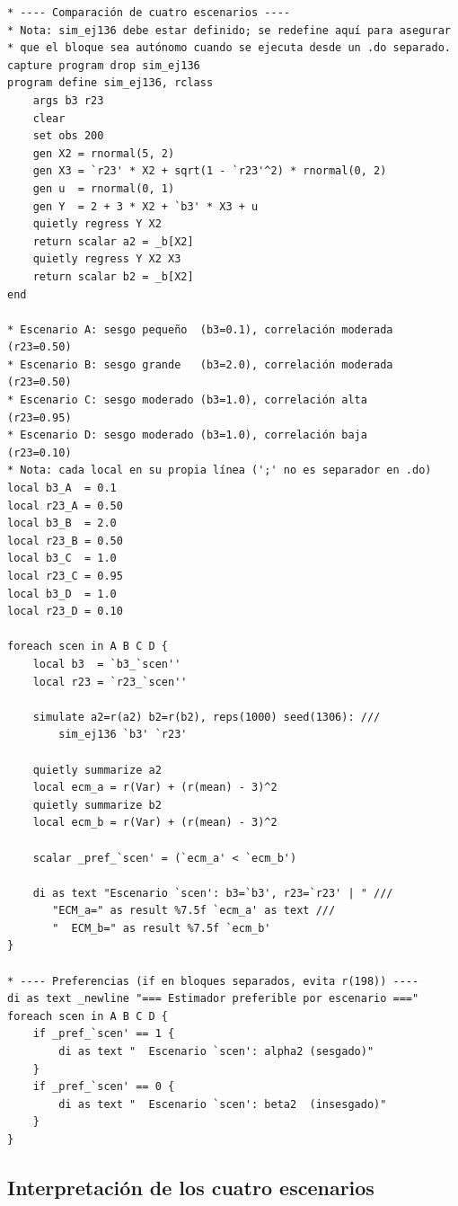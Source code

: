 \documentclass[12pt, letterpaper]{article}
\begin{document}
\begin{lstlisting}[caption={Cuatro escenarios de tradeoff sesgo-varianza
  (requiere ejecutar el bloque anterior primero para definir sim\_ej136)}]
* ---- Comparación de cuatro escenarios ----
* Nota: sim_ej136 debe estar definido; se redefine aquí para asegurar
* que el bloque sea autónomo cuando se ejecuta desde un .do separado.
capture program drop sim_ej136
program define sim_ej136, rclass
    args b3 r23
    clear
    set obs 200
    gen X2 = rnormal(5, 2)
    gen X3 = `r23' * X2 + sqrt(1 - `r23'^2) * rnormal(0, 2)
    gen u  = rnormal(0, 1)
    gen Y  = 2 + 3 * X2 + `b3' * X3 + u
    quietly regress Y X2
    return scalar a2 = _b[X2]
    quietly regress Y X2 X3
    return scalar b2 = _b[X2]
end

* Escenario A: sesgo pequeño  (b3=0.1), correlación moderada (r23=0.50)
* Escenario B: sesgo grande   (b3=2.0), correlación moderada (r23=0.50)
* Escenario C: sesgo moderado (b3=1.0), correlación alta     (r23=0.95)
* Escenario D: sesgo moderado (b3=1.0), correlación baja     (r23=0.10)
* Nota: cada local en su propia línea (';' no es separador en .do)
local b3_A  = 0.1
local r23_A = 0.50
local b3_B  = 2.0
local r23_B = 0.50
local b3_C  = 1.0
local r23_C = 0.95
local b3_D  = 1.0
local r23_D = 0.10

foreach scen in A B C D {
    local b3  = `b3_`scen''
    local r23 = `r23_`scen''

    simulate a2=r(a2) b2=r(b2), reps(1000) seed(1306): ///
        sim_ej136 `b3' `r23'

    quietly summarize a2
    local ecm_a = r(Var) + (r(mean) - 3)^2
    quietly summarize b2
    local ecm_b = r(Var) + (r(mean) - 3)^2

    scalar _pref_`scen' = (`ecm_a' < `ecm_b')

    di as text "Escenario `scen': b3=`b3', r23=`r23' | " ///
       "ECM_a=" as result %7.5f `ecm_a' as text ///
       "  ECM_b=" as result %7.5f `ecm_b'
}

* ---- Preferencias (if en bloques separados, evita r(198)) ----
di as text _newline "=== Estimador preferible por escenario ==="
foreach scen in A B C D {
    if _pref_`scen' == 1 {
        di as text "  Escenario `scen': alpha2 (sesgado)"
    }
    if _pref_`scen' == 0 {
        di as text "  Escenario `scen': beta2  (insesgado)"
    }
}
\end{lstlisting}

\subsection{Interpretación de los cuatro escenarios}
\end{document}
